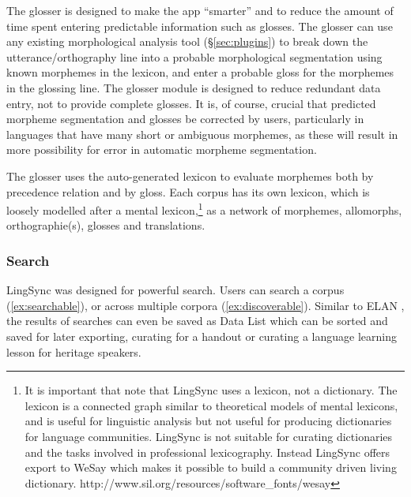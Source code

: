 \documentclass[letterpaper, 12pt, dvips]{mitwpl}
\begin{document}
The glosser is designed to make the app ``smarter'' and to reduce the amount of time spent entering predictable information such as glosses.
The glosser can use any existing morphological analysis tool (\S \ref{sec:plugins}) to break down the utterance/orthography line  into a probable morphological segmentation using known morphemes in the lexicon,
and enter a probable gloss for the morphemes in the glossing line.
The glosser module is designed to reduce redundant data entry,
not to provide complete glosses.
It is, of course, crucial that predicted morpheme segmentation and glosses be corrected by users,
particularly in languages that have many short or ambiguous morphemes,
as these will result in more possibility for error in automatic morpheme segmentation.
 

The glosser uses the auto-generated lexicon to evaluate morphemes both by precedence relation and by gloss.
Each corpus has its own lexicon,
which is loosely modelled after a mental lexicon,\footnote{It is important that note that LingSync uses a lexicon, not a dictionary. The lexicon is a connected graph similar to theoretical models of mental lexicons, and is useful for linguistic analysis but not useful for producing dictionaries for language communities. LingSync is not suitable for curating dictionaries and the tasks involved in professional lexicography. Instead LingSync offers export to WeSay which makes it possible to build a community driven living dictionary. http://www.sil.org/resources/software\_fonts/wesay} 
as a network of morphemes,
allomorphs,
orthographie(s),
glosses and translations.


\subsubsection{Search}

LingSync was designed for powerful search.
Users can search a corpus (\ref{ex:searchable}),
or across multiple corpora (\ref{ex:discoverable}).
Similar to ELAN \citep{Wittenburg:2006}, 
the results of  searches can even be saved as Data List which can be sorted and
saved for later exporting, curating for a handout or curating a language learning lesson for heritage speakers.
\end{document}
